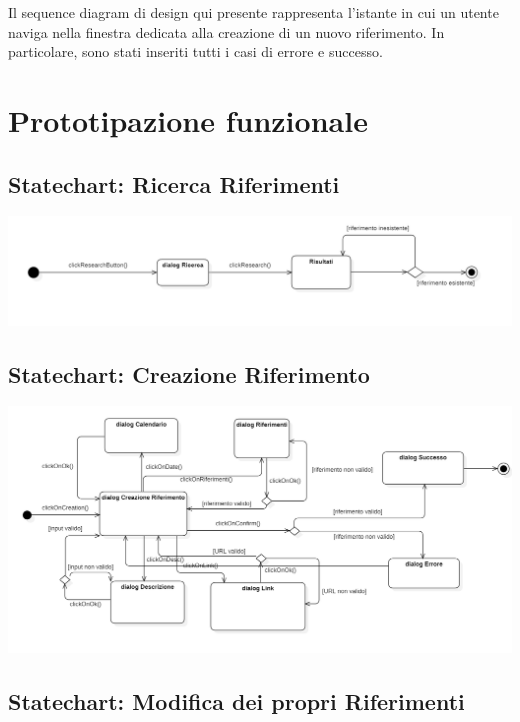 Il sequence diagram di design qui presente rappresenta l'istante in cui un utente naviga nella finestra dedicata alla creazione di un nuovo riferimento. In particolare, sono stati inseriti tutti i casi di errore e successo.

\raggedright{\section{Prototipazione funzionale}}

\raggedright{\subsection{Statechart: Ricerca Riferimenti}}

        \begin{center}
            \includegraphics[width=.95\textwidth]{Immagini/Alexandria/Statechart Ricerca.PNG} 
        \end{center}

\raggedright{\subsection{Statechart: Creazione Riferimento}}

        \begin{center}
            \includegraphics[width=.95\textwidth]{Immagini/Alexandria/Statechart Creazione Riferimento.PNG} 
        \end{center}

\raggedright{\subsection{Statechart: Modifica dei propri Riferimenti}}

